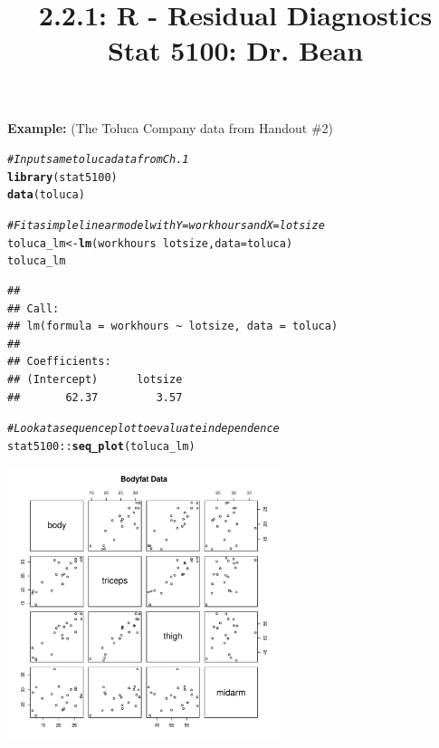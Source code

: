 \documentclass{article}\usepackage[]{graphicx}\usepackage[]{color}
\makeatletter
\newcommand{\hlcom}[1]{\textcolor[rgb]{0.678,0.584,0.686}{\textit{#1}}}%
\newcommand{\hlopt}[1]{\textcolor[rgb]{0,0,0}{#1}}%
\newcommand{\hlstd}[1]{\textcolor[rgb]{0.345,0.345,0.345}{#1}}%
\newcommand{\hlkwb}[1]{\textcolor[rgb]{0.69,0.353,0.396}{#1}}%
\newcommand{\hlkwc}[1]{\textcolor[rgb]{0.333,0.667,0.333}{#1}}%
\newcommand{\hlkwd}[1]{\textcolor[rgb]{0.737,0.353,0.396}{\textbf{#1}}}%
\newenvironment{kframe}{%
 \def\at@end@of@kframe{}%
 \ifinner\ifhmode%
  \def\at@end@of@kframe{\end{minipage}}%
  \begin{minipage}{\columnwidth}%
 \fi\fi%
 \def\FrameCommand##1{\hskip\@totalleftmargin \hskip-\fboxsep
 \colorbox{shadecolor}{##1}\hskip-\fboxsep
     \hskip-\linewidth \hskip-\@totalleftmargin \hskip\columnwidth}%
 \MakeFramed {\advance\hsize-\width
   \@totalleftmargin\z@ \linewidth\hsize
   \@setminipage}}%
 {\par\unskip\endMakeFramed%
 \at@end@of@kframe}
\newenvironment{knitrout}{}{} %
\makeatother
\begin{document}
\title{%
  2.2.1: R - Residual Diagnostics\\
  \smallskip
  \large Stat 5100: Dr. Bean
}
\date{}

\maketitle

\textbf{Example: } (The Toluca Company data from Handout \#2)

\begin{knitrout}
\color{fgcolor}\begin{kframe}
\begin{alltt}
\hlcom{# Input same toluca data from Ch. 1}
\hlkwd{library}\hlstd{(stat5100)}
\hlkwd{data}\hlstd{(toluca)}

\hlcom{# Fit a simple linear model with Y=workhours and X=lotsize}
\hlstd{toluca_lm} \hlkwb{<-} \hlkwd{lm}\hlstd{(workhours} \hlopt{~} \hlstd{lotsize,} \hlkwc{data} \hlstd{= toluca)}
\hlstd{toluca_lm}
\end{alltt}
\begin{verbatim}
## 
## Call:
## lm(formula = workhours ~ lotsize, data = toluca)
## 
## Coefficients:
## (Intercept)      lotsize  
##       62.37         3.57
\end{verbatim}
\begin{alltt}
\hlcom{# Look at a sequence plot to evaluate independence}
\hlstd{stat5100}\hlopt{::}\hlkwd{seq_plot}\hlstd{(toluca_lm)}
\end{alltt}
\end{kframe}

{\centering \includegraphics[width=0.6\textwidth]{figure/unnamed-chunk-1-1} 

}



\end{knitrout}
\end{document}
